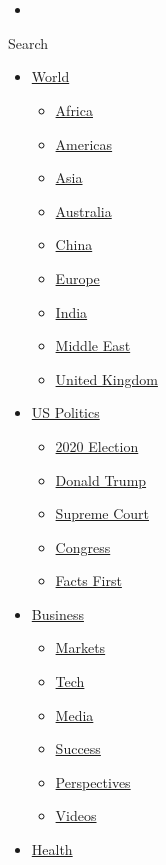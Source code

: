 \hypertarget{-}{%
\subsection{~}\label{-}}

\begin{itemize}
\item
\end{itemize}

Search

\begin{itemize}
\tightlist
\item
  \href{/world}{World}

  \begin{itemize}
  \tightlist
  \item
    \href{/africa}{Africa}
  \item
    \href{/americas}{Americas}
  \item
    \href{/asia}{Asia}
  \item
    \href{/australia}{Australia}
  \item
    \href{/china}{China}
  \item
    \href{/europe}{Europe}
  \item
    \href{/india}{India}
  \item
    \href{/middle-east}{Middle East}
  \item
    \href{/uk}{United Kingdom}
  \end{itemize}
\item
  \href{/politics}{US Politics}

  \begin{itemize}
  \tightlist
  \item
    \href{/election/2020}{2020 Election}
  \item
    \href{/specials/politics/president-donald-trump-45}{Donald Trump}
  \item
    \href{/specials/politics/supreme-court-nine}{Supreme Court}
  \item
    \href{/specials/politics/congress}{Congress}
  \item
    \href{/specials/politics/fact-check-politics}{Facts First}
  \end{itemize}
\item
  \href{/business}{Business}

  \begin{itemize}
  \tightlist
  \item
    \href{https://money.cnn.com/data/markets/}{Markets}
  \item
    \href{/business/tech}{Tech}
  \item
    \href{/business/media}{Media}
  \item
    \href{/business/success}{Success}
  \item
    \href{/business/perspectives}{Perspectives}
  \item
    \href{/business/videos}{Videos}
  \end{itemize}
\item
  \href{/health}{Health}


\end{itemize}
